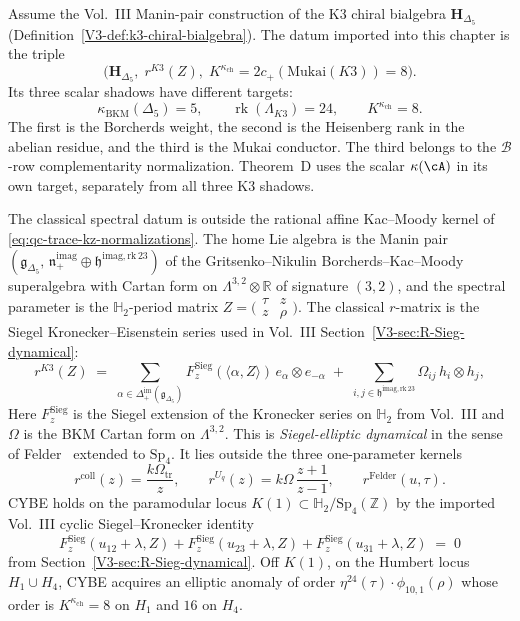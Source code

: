 \begin{remark}
\label{rem:k3-classical-rmatrix}%
%
%
Assume the Vol.~III Manin-pair construction of the K3 chiral
bialgebra $\mathbf H_{\Delta_5}$
(Definition~\ref{V3-def:k3-chiral-bialgebra}).  The datum imported
into this chapter is the triple
\[
\bigl(\mathbf H_{\Delta_5},\; r^{K3}(Z),\;
K^{\kappa_{\mathrm{ch}}}=2c_+(\mathrm{Mukai}(K3))=8\bigr).
\]
Its three scalar shadows have different targets:
\[
\kappa_{\mathrm{BKM}}(\Delta_5)=5,\qquad
\operatorname{rk}(\Lambda_{K3})=24,\qquad
K^{\kappa_{\mathrm{ch}}}=8.
\]
The first is the Borcherds weight, the second is the Heisenberg
rank in the abelian residue, and the third is the Mukai conductor.
The third belongs to the $\mathcal B$-row complementarity
normalization.  Theorem~D uses the scalar $\kappa(\cA)$ in its own
target, separately from all three K3 shadows.

The classical spectral datum is outside the rational affine
Kac--Moody kernel of \eqref{eq:qc-trace-kz-normalizations}.  The home
Lie algebra is the Manin pair
$(\mathfrak{g}_{\Delta_5},\, \mathfrak{n}_{+}^{\mathrm{imag}}\oplus
\mathfrak{h}^{\mathrm{imag,rk\,23}})$ of the Gritsenko--Nikulin
Borcherds--Kac--Moody superalgebra with Cartan form on
$\Lambda^{3,2}\otimes\mathbb{R}$ of signature $(3,2)$, and the spectral
parameter is the $\mathbb{H}_2$-period matrix
$Z = \bigl(\begin{smallmatrix}\tau & z\\ z & \rho\end{smallmatrix}\bigr)$.
The classical $r$-matrix is the Siegel Kronecker--Eisenstein series
used in Vol.~III Section~\ref{V3-sec:R-Sieg-dynamical}:
\[
 r^{K3}(Z)
 \;=\;
 \sum_{\alpha\in \Delta^{\mathrm{im}}_+(\mathfrak{g}_{\Delta_5})}
 F^{\mathrm{Sieg}}_z(\langle\alpha,Z\rangle)\, e_\alpha\otimes e_{-\alpha}
 \;+\;
 \sum_{i,j\in \mathfrak{h}^{\mathrm{imag,rk\,23}}}
 \Omega_{ij}\, h_i\otimes h_j,
\]
Here $F^{\mathrm{Sieg}}_z$ is the Siegel extension of the
Kronecker series on $\mathbb{H}_2$ from Vol.~III and $\Omega$ is the
BKM Cartan form on $\Lambda^{3,2}$.  This is
\emph{Siegel-elliptic dynamical} in the sense of
Felder~\cite{Felder94} extended to
$\mathrm{Sp}_4$.  It lies outside the three one-parameter kernels
\[
r^{\mathrm{coll}}(z)=\frac{k\Omega_{\mathrm{tr}}}{z},\qquad
r^{U_q}(z)=k\Omega\,\frac{z+1}{z-1},\qquad
r^{\mathrm{Felder}}(u,\tau).
\]
CYBE holds on the paramodular locus
$K(1)\subset \mathbb{H}_2/\mathrm{Sp}_4(\mathbb{Z})$ by the imported
Vol.~III cyclic Siegel--Kronecker identity
\[
 F^{\mathrm{Sieg}}_z(u_{12}+\lambda,Z) + F^{\mathrm{Sieg}}_z(u_{23}+\lambda,Z)
 + F^{\mathrm{Sieg}}_z(u_{31}+\lambda,Z) \;=\; 0
\]
from Section~\ref{V3-sec:R-Sieg-dynamical}.  Off
$K(1)$, on the Humbert locus $H_1\cup H_4$, CYBE acquires an elliptic
anomaly of order $\eta^{24}(\tau)\cdot\phi_{10,1}(\rho)$ whose order is
$K^{\kappa_{\mathrm{ch}}} = 8$ on $H_1$ and $16$ on $H_4$.


\end{remark}
